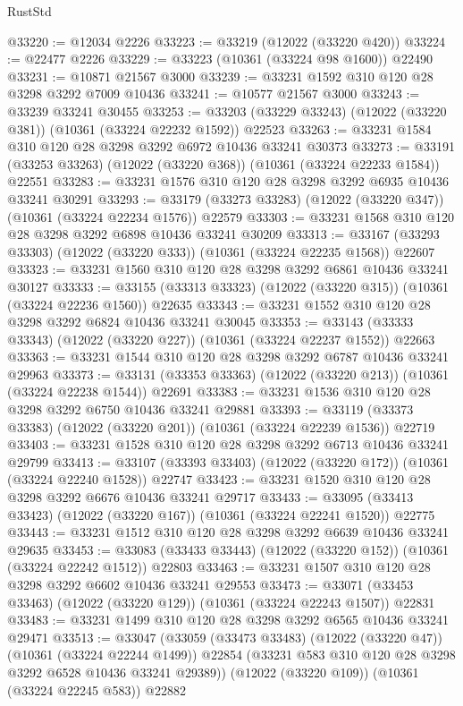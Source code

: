 \begin{lexlean}{RustStd}
\begin{coremodule}
@33220 := @12034 @2226
@33223 := @33219 (@12022 (@33220 @420))
@33224 := @22477 @2226
@33229 := @33223 (@10361 (@33224 @98 @1600)) @22490
@33231 := @10871 @21567 @3000
@33239 := @33231 @1592 @310 @120 @28 @3298 @3292 @7009 @10436
@33241 := @10577 @21567 @3000
@33243 := @33239 @33241 @30455
@33253 := @33203 (@33229 @33243) (@12022 (@33220 @381)) (@10361 (@33224 @22232 @1592)) @22523
@33263 := @33231 @1584 @310 @120 @28 @3298 @3292 @6972 @10436 @33241 @30373
@33273 := @33191 (@33253 @33263) (@12022 (@33220 @368)) (@10361 (@33224 @22233 @1584)) @22551
@33283 := @33231 @1576 @310 @120 @28 @3298 @3292 @6935 @10436 @33241 @30291
@33293 := @33179 (@33273 @33283) (@12022 (@33220 @347)) (@10361 (@33224 @22234 @1576)) @22579
@33303 := @33231 @1568 @310 @120 @28 @3298 @3292 @6898 @10436 @33241 @30209
@33313 := @33167 (@33293 @33303) (@12022 (@33220 @333)) (@10361 (@33224 @22235 @1568)) @22607
@33323 := @33231 @1560 @310 @120 @28 @3298 @3292 @6861 @10436 @33241 @30127
@33333 := @33155 (@33313 @33323) (@12022 (@33220 @315)) (@10361 (@33224 @22236 @1560)) @22635
@33343 := @33231 @1552 @310 @120 @28 @3298 @3292 @6824 @10436 @33241 @30045
@33353 := @33143 (@33333 @33343) (@12022 (@33220 @227)) (@10361 (@33224 @22237 @1552)) @22663
@33363 := @33231 @1544 @310 @120 @28 @3298 @3292 @6787 @10436 @33241 @29963
@33373 := @33131 (@33353 @33363) (@12022 (@33220 @213)) (@10361 (@33224 @22238 @1544)) @22691
@33383 := @33231 @1536 @310 @120 @28 @3298 @3292 @6750 @10436 @33241 @29881
@33393 := @33119 (@33373 @33383) (@12022 (@33220 @201)) (@10361 (@33224 @22239 @1536)) @22719
@33403 := @33231 @1528 @310 @120 @28 @3298 @3292 @6713 @10436 @33241 @29799
@33413 := @33107 (@33393 @33403) (@12022 (@33220 @172)) (@10361 (@33224 @22240 @1528)) @22747
@33423 := @33231 @1520 @310 @120 @28 @3298 @3292 @6676 @10436 @33241 @29717
@33433 := @33095 (@33413 @33423) (@12022 (@33220 @167)) (@10361 (@33224 @22241 @1520)) @22775
@33443 := @33231 @1512 @310 @120 @28 @3298 @3292 @6639 @10436 @33241 @29635
@33453 := @33083 (@33433 @33443) (@12022 (@33220 @152)) (@10361 (@33224 @22242 @1512)) @22803
@33463 := @33231 @1507 @310 @120 @28 @3298 @3292 @6602 @10436 @33241 @29553
@33473 := @33071 (@33453 @33463) (@12022 (@33220 @129)) (@10361 (@33224 @22243 @1507)) @22831
@33483 := @33231 @1499 @310 @120 @28 @3298 @3292 @6565 @10436 @33241 @29471
@33513 := @33047
    (@33059
      (@33473 @33483)
      (@12022 (@33220 @47))
      (@10361 (@33224 @22244 @1499))
      @22854
      (@33231 @583 @310 @120 @28 @3298 @3292 @6528 @10436 @33241 @29389))
    (@12022 (@33220 @109))
    (@10361 (@33224 @22245 @583))
    @22882

\end{coremodule}
\end{lexlean}
